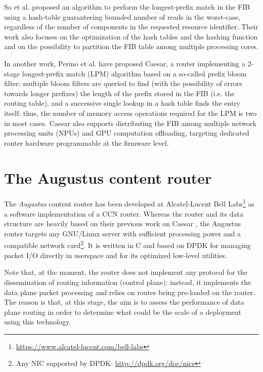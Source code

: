 \documentclass[11pt,a4paper,twoside,titlepage,openany]{book}
\begin{document}
So et al. \cite{ndn_fast_dosresistant} proposed an algorithm to perform the longest-prefix match in the \gls{FIB} using a hash-table guaranteeing bounded number of reads in the worst-case, regardless of the number of components in the requested resource identifier. Their work also focuses on the optimization of the hash tables and the hashing function and on the possibility to partition the \gls{FIB} table among multiple processing cores.

In another work, Perino et al. \cite{caesar} have proposed Caesar, a router implementing a 2-stage longest-prefix match (LPM) algorithm based on a so-called prefix bloom filter: multiple bloom filters are queried to find (with the possibility of errors towards longer prefixes) the length of the prefix stored in the \gls{FIB} (i.e. the routing table), and a successive single lookup in a hash table finds the entry itself: thus, the number of memory access operations required for the LPM is two in most cases. Caesar also supports distributing the \gls{FIB} among multiple network processing units (NPUs) and GPU computation offloading, targeting dedicated router hardware programmable at the firmware level.



\chapter{The Augustus content router}
\label{chap:augustus}

The \emph{Augustus} content router has been developed at Alcatel-Lucent Bell Labs\footnote{\url{https://www.alcatel-lucent.com/bell-labs}} as a software implementation of a \gls{CCN} router.
Whereas the router and its data structure are heavily based on their previous work on Caesar \cite{caesar}, the Augustus router targets any GNU/Linux server with sufficient processing power and a compatible network card\footnote{Any NIC supported by DPDK: \url{http://dpdk.org/doc/nics}}. It is written in C and based on DPDK \cite{dpdk} for managing packet I/O directly in userspace and for its optimized low-level utilities.

Note that, at the moment, the router does not implement any protocol for the dissemination of routing information (control plane): instead, it implements the data plane packet processing and relies on routes being pre-loaded on the router. The reason is that, at this stage, the aim is to assess the performance of data plane routing in order to determine what could be the scale of a deployment using this technology.
\end{document}
